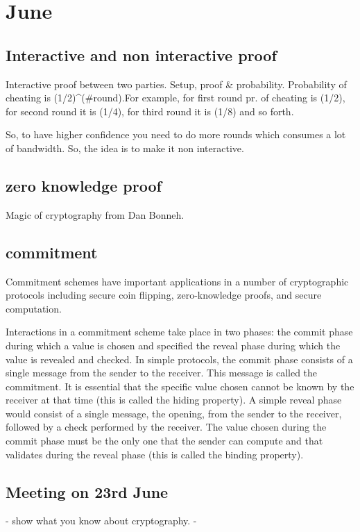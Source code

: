\chapter{June}

	\section{Interactive and non interactive proof}

	Interactive proof between two parties. 
	Setup, proof & probability. Probability of cheating is (1/2)^(#round).For example, for first round pr. of cheating is (1/2), for second round it is (1/4), for third round it is (1/8) and so forth.

	So, to have higher confidence you need to do more rounds which consumes a lot of bandwidth. So, the idea is to make it non interactive. 

	\section{zero knowledge proof}

	Magic of cryptography from Dan Bonneh.
	
	\section{commitment}
	Commitment schemes have important applications in a number of cryptographic protocols including secure coin flipping, zero-knowledge proofs, and secure computation.
	
	Interactions in a commitment scheme take place in two phases:
	the commit phase during which a value is chosen and specified the reveal phase during which the value is revealed and checked. In simple protocols, the commit phase consists of a single message from the sender to the receiver. This message is called the commitment. It is essential that the specific value chosen cannot be known by the receiver at that time (this is called the hiding property). A simple reveal phase would consist of a single message, the opening, from the sender to the receiver, followed by a check performed by the receiver. The value chosen during the commit phase must be the only one that the sender can compute and that validates during the reveal phase (this is called the binding property).
	
	\section{Meeting on 23rd June}

	- show what you know about cryptography.
	- 

